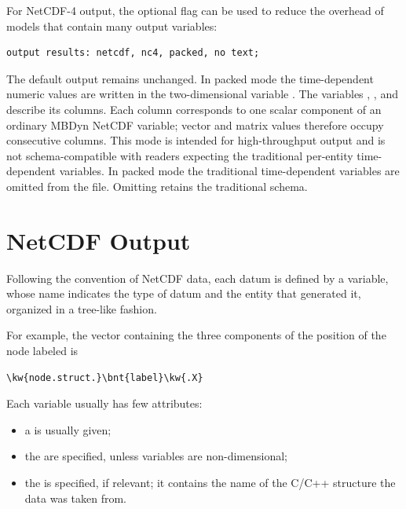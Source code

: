 For NetCDF-4 output, the optional  flag can be used to reduce
the overhead of models that contain many output variables:
\begin{Verbatim}[commandchars=\\\{\}]
    output results: netcdf, nc4, packed, no text;
\end{Verbatim}
The default output remains unchanged.  In packed mode the time-dependent
numeric values are written in the two-dimensional variable
.  The variables
, , and
 describe its columns.  Each column corresponds to
one scalar component of an ordinary MBDyn NetCDF variable; vector and matrix
values therefore occupy consecutive columns.  This mode is intended for
high-throughput output and is not schema-compatible with readers expecting
the traditional per-entity time-dependent variables.  In packed mode the
traditional time-dependent variables are omitted from the file.  Omitting
 retains the traditional schema.



\section{NetCDF Output}

Following the convention of NetCDF data, each datum is defined
by a variable, whose name indicates the type of datum and the entity
that generated it, organized in a tree-like fashion.

For example, the vector containing the three components 
of the position of the  node labeled  is
\begin{Verbatim}[commandchars=\\\{\}]
    \kw{node.struct.}\bnt{label}\kw{.X}
\end{Verbatim}
Each variable usually has few attributes:
\begin{itemize}
\item a  is usually given;
\item the  are specified, unless variables are non-dimensional;
\item the  is specified, if relevant;
it contains the name of the C/C++ structure the data was taken from.
\end{itemize}

